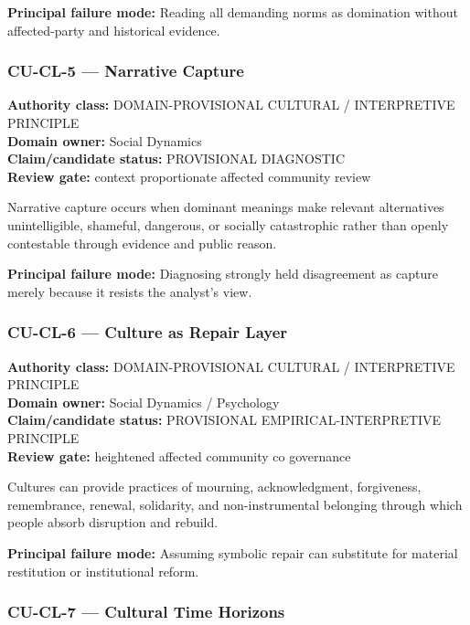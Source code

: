 \documentclass[
  11pt,
]{article}
\begin{document}
\textbf{Principal failure mode:} Reading all demanding norms as
domination without affected-party and historical evidence.

\subsubsection{CU-CL-5 --- Narrative
Capture}\label{cu-cl-5-narrative-capture}

\textbf{Authority class:} DOMAIN-PROVISIONAL CULTURAL / INTERPRETIVE
PRINCIPLE\\
\textbf{Domain owner:} Social Dynamics\\
\textbf{Claim/candidate status:} PROVISIONAL DIAGNOSTIC\\
\textbf{Review gate:} context proportionate affected community review

Narrative capture occurs when dominant meanings make relevant
alternatives unintelligible, shameful, dangerous, or socially
catastrophic rather than openly contestable through evidence and public
reason.

\textbf{Principal failure mode:} Diagnosing strongly held disagreement
as capture merely because it resists the analyst's view.

\subsubsection{CU-CL-6 --- Culture as Repair
Layer}\label{cu-cl-6-culture-as-repair-layer}

\textbf{Authority class:} DOMAIN-PROVISIONAL CULTURAL / INTERPRETIVE
PRINCIPLE\\
\textbf{Domain owner:} Social Dynamics / Psychology\\
\textbf{Claim/candidate status:} PROVISIONAL EMPIRICAL-INTERPRETIVE
PRINCIPLE\\
\textbf{Review gate:} heightened affected community co governance

Cultures can provide practices of mourning, acknowledgment, forgiveness,
remembrance, renewal, solidarity, and non-instrumental belonging through
which people absorb disruption and rebuild.

\textbf{Principal failure mode:} Assuming symbolic repair can substitute
for material restitution or institutional reform.

\subsubsection{CU-CL-7 --- Cultural Time
Horizons}\label{cu-cl-7-cultural-time-horizons}
\end{document}
